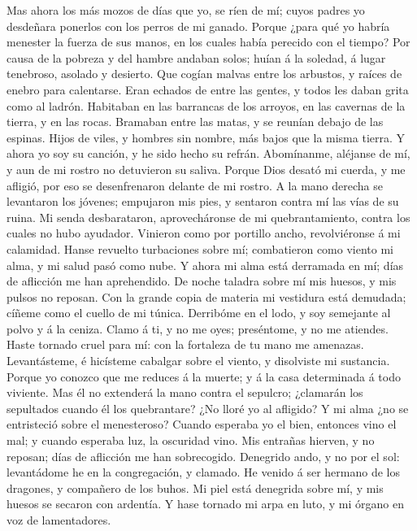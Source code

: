  Mas ahora los más mozos de días que yo, se ríen de mí;
cuyos padres yo desdeñara ponerlos con los perros de mi ganado.
 Porque ¿para qué yo habría menester la fuerza de sus
manos, en los cuales había perecido con el tiempo?  Por
causa de la pobreza y del hambre andaban solos; huían á la soledad, á
lugar tenebroso, asolado y desierto.  Que cogían malvas
entre los arbustos, y raíces de enebro para calentarse. 
Eran echados de entre las gentes, y todos les daban grita como al
ladrón.  Habitaban en las barrancas de los arroyos, en las
cavernas de la tierra, y en las rocas.  Bramaban entre las
matas, y se reunían debajo de las espinas.  Hijos de
viles, y hombres sin nombre, más bajos que la misma tierra.
 Y ahora yo soy su canción, y he sido hecho su refrán.
 Abomínanme, aléjanse de mí, y aun de mi rostro no
detuvieron su saliva.  Porque Dios desató mi cuerda, y me
afligió, por eso se desenfrenaron delante de mi rostro. 
A la mano derecha se levantaron los jóvenes; empujaron mis pies, y
sentaron contra mí las vías de su ruina.  Mi senda
desbarataron, aprovecháronse de mi quebrantamiento, contra los cuales no
hubo ayudador.  Vinieron como por portillo ancho,
revolviéronse á mi calamidad.  Hanse revuelto turbaciones
sobre mí; combatieron como viento mi alma, y mi salud pasó como nube.
 Y ahora mi alma está derramada en mí; días de aflicción
me han aprehendido.  De noche taladra sobre mí mis
huesos, y mis pulsos no reposan.  Con la grande copia de
materia mi vestidura está demudada; cíñeme como el cuello de mi túnica.
 Derribóme en el lodo, y soy semejante al polvo y á la
ceniza.  Clamo á ti, y no me oyes; preséntome, y no me
atiendes.  Haste tornado cruel para mí: con la fortaleza
de tu mano me amenazas.  Levantásteme, é hicísteme
cabalgar sobre el viento, y disolviste mi sustancia. 
Porque yo conozco que me reduces á la muerte; y á la casa determinada á
todo viviente.  Mas él no extenderá la mano contra el
sepulcro; ¿clamarán los sepultados cuando él los quebrantare?
 ¿No lloré yo al afligido? Y mi alma ¿no se entristeció
sobre el menesteroso?  Cuando esperaba yo el bien,
entonces vino el mal; y cuando esperaba luz, la oscuridad vino.
 Mis entrañas hierven, y no reposan; días de aflicción me
han sobrecogido.  Denegrido ando, y no por el sol:
levantádome he en la congregación, y clamado.  He venido
á ser hermano de los dragones, y compañero de los buhos. 
Mi piel está denegrida sobre mí, y mis huesos se secaron con ardentía.
 Y hase tornado mi arpa en luto, y mi órgano en voz de
lamentadores.

